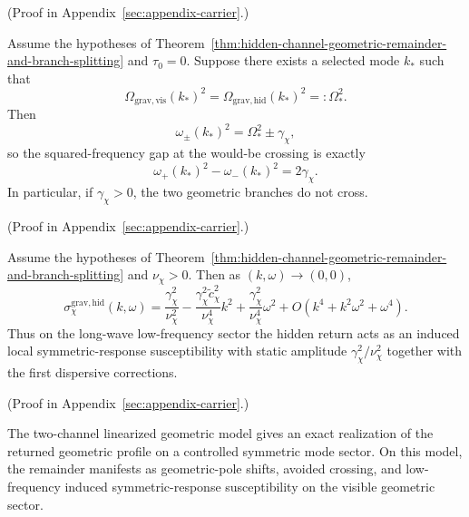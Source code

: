 (Proof in Appendix~\ref{sec:appendix-carrier}.)

\begin{corollary}
\label{cor:exact-avoided-crossing-coupled-geometric-branches}
Assume the hypotheses of
Theorem~\ref{thm:hidden-channel-geometric-remainder-and-branch-splitting} and
\(\tau_0=0\). Suppose there exists a selected mode \(k_\ast\) such that
\[
\Omega_{\mathrm{grav,vis}}(k_\ast)^2
=
\Omega_{\mathrm{grav,hid}}(k_\ast)^2
=:
\Omega_{\ast}^2.
\]
Then
\[
\omega_{\pm}(k_\ast)^2=\Omega_{\ast}^2\pm\gamma_{\chi},
\]
so the squared-frequency gap at the would-be crossing is exactly
\[
\omega_+(k_\ast)^2-\omega_-(k_\ast)^2=2\gamma_{\chi}.
\]
In particular, if \(\gamma_{\chi}>0\), the two geometric branches do not
cross.
\end{corollary}

(Proof in Appendix~\ref{sec:appendix-carrier}.)

\begin{corollary}
\label{cor:low-frequency-induced-geometric-susceptibility}
Assume the hypotheses of
Theorem~\ref{thm:hidden-channel-geometric-remainder-and-branch-splitting} and
\(\nu_{\chi}>0\). Then as \((k,\omega)\to(0,0)\),
\[
\sigma_{\chi}^{\mathrm{grav,hid}}(k,\omega)
=
\frac{\gamma_{\chi}^2}{\nu_{\chi}^2}
-
\frac{\gamma_{\chi}^2\widetilde c_{\chi}^2}{\nu_{\chi}^4}k^2
+
\frac{\gamma_{\chi}^2}{\nu_{\chi}^4}\omega^2
+
O(k^4+k^2\omega^2+\omega^4).
\]
Thus on the long-wave low-frequency sector the hidden return acts as an
induced local symmetric-response susceptibility with static amplitude
\(\gamma_{\chi}^2/\nu_{\chi}^2\) together with the first dispersive
corrections.
\end{corollary}

(Proof in Appendix~\ref{sec:appendix-carrier}.)

The two-channel linearized geometric model gives an exact realization of the
returned geometric profile on a controlled symmetric mode sector. On this
model, the remainder manifests as geometric-pole shifts, avoided crossing, and
low-frequency induced symmetric-response susceptibility on the visible
geometric sector.
